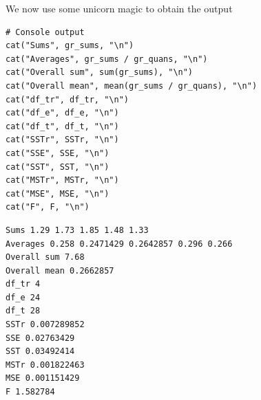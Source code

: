 \documentclass[a4paper]{article}
\numberwithin{equation}{section}
\begin{document}
We now use some unicorn magic to obtain the output
\begin{mdframed}[leftline=false,rightline=false,backgroundcolor=magenta!10,nobreak=true]
  \begin{verbatim}
# Console output
cat("Sums", gr_sums, "\n")
cat("Averages", gr_sums / gr_quans, "\n")
cat("Overall sum", sum(gr_sums), "\n")
cat("Overall mean", mean(gr_sums / gr_quans), "\n")
cat("df_tr", df_tr, "\n")
cat("df_e", df_e, "\n")
cat("df_t", df_t, "\n")
cat("SSTr", SSTr, "\n")
cat("SSE", SSE, "\n")
cat("SST", SST, "\n")
cat("MSTr", MSTr, "\n")
cat("MSE", MSE, "\n")
cat("F", F, "\n")
  \end{verbatim}
\end{mdframed}

\begin{mdframed}[leftline=false,rightline=false,backgroundcolor=gray!10,nobreak=true]
  \begin{verbatim}
Sums 1.29 1.73 1.85 1.48 1.33
Averages 0.258 0.2471429 0.2642857 0.296 0.266
Overall sum 7.68
Overall mean 0.2662857
df_tr 4
df_e 24
df_t 28
SSTr 0.007289852
SSE 0.02763429
SST 0.03492414
MSTr 0.001822463
MSE 0.001151429
F 1.582784
  \end{verbatim}
\end{mdframed}
\end{document}
